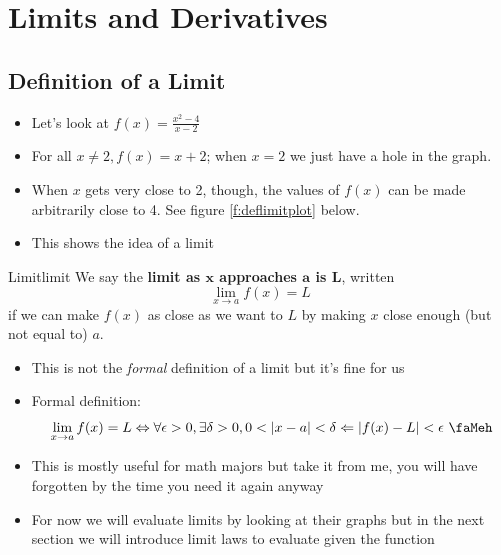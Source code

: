 \documentclass[letterpaper, 11pt, openany]{book}
\theoremstyle{mytheoremstyle}
\theoremstyle{myexamplestyle}
\begin{document}
\newpage\thispagestyle{firstofchapter}
\chapter{Limits and Derivatives}
\section{Definition of a Limit}
\setcounter{figure}{0}

\begin{itemize}
    \item Let's look at $\displaystyle f(x) = \frac{x^{2} - 4}{x - 2}$
    \item For all $x \neq 2, f(x) = x + 2$; when $x = 2$ we just have a hole in the graph.
    \item When $x$ gets very close to 2, though, the values of $f(x)$ can be made arbitrarily close to 4. See figure \ref{f:deflimitplot} below.
    \item This shows the idea of a limit
\end{itemize}

\begin{definition}{Limit}{limit}
    We say the \textbf{limit as $\bm{x}$ approaches $\bm{a}$ is $\bm{L}$}, written
    \[
        \lim_{x \to a} f(x) = L  
    \]
    if we can make $f(x)$ as close as we want to $L$ by making $x$ close enough (but not equal to) $a$.
\end{definition}

\begin{itemize}
    \item This is not the \textit{formal} definition of a limit but it's fine for us \faSmile
    \item Formal definition:
    \[
        \lim_{x \to a} f(x) = L \Leftrightarrow \forall \epsilon > 0, \exists \delta > 0, 0 < | x - a | < \delta \Leftarrow | f(x) - L | < \epsilon \text{ \faMeh} 
    \]
    \item This is mostly useful for math majors but take it from me, you will have forgotten by the time you need it again anyway \faSmile
    \item For now we will evaluate limits by looking at their graphs but in the next section we will introduce limit laws to evaluate given the function
\end{itemize}
\end{document}
